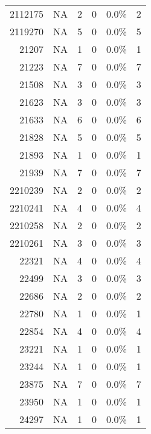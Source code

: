 \begin{longtable}{lrrrrr}
	    \multicolumn{1}{r}{2112175} & NA    & 2     & 0     & 0.0\% & 2 \\
	    \multicolumn{1}{r}{2119270} & NA    & 5     & 0     & 0.0\% & 5 \\
	    \multicolumn{1}{r}{21207} & NA    & 1     & 0     & 0.0\% & 1 \\
	    \multicolumn{1}{r}{21223} & NA    & 7     & 0     & 0.0\% & 7 \\
	    \multicolumn{1}{r}{21508} & NA    & 3     & 0     & 0.0\% & 3 \\
	    \multicolumn{1}{r}{21623} & NA    & 3     & 0     & 0.0\% & 3 \\
	    \multicolumn{1}{r}{21633} & NA    & 6     & 0     & 0.0\% & 6 \\
	    \multicolumn{1}{r}{21828} & NA    & 5     & 0     & 0.0\% & 5 \\
	    \multicolumn{1}{r}{21893} & NA    & 1     & 0     & 0.0\% & 1 \\
	    \multicolumn{1}{r}{21939} & NA    & 7     & 0     & 0.0\% & 7 \\
	    \multicolumn{1}{r}{2210239} & NA    & 2     & 0     & 0.0\% & 2 \\
	    \multicolumn{1}{r}{2210241} & NA    & 4     & 0     & 0.0\% & 4 \\
	    \multicolumn{1}{r}{2210258} & NA    & 2     & 0     & 0.0\% & 2 \\
	    \multicolumn{1}{r}{2210261} & NA    & 3     & 0     & 0.0\% & 3 \\
	    \multicolumn{1}{r}{22321} & NA    & 4     & 0     & 0.0\% & 4 \\
	    \multicolumn{1}{r}{22499} & NA    & 3     & 0     & 0.0\% & 3 \\
	    \multicolumn{1}{r}{22686} & NA    & 2     & 0     & 0.0\% & 2 \\
	    \multicolumn{1}{r}{22780} & NA    & 1     & 0     & 0.0\% & 1 \\
	    \multicolumn{1}{r}{22854} & NA    & 4     & 0     & 0.0\% & 4 \\
	    \multicolumn{1}{r}{23221} & NA    & 1     & 0     & 0.0\% & 1 \\
	    \multicolumn{1}{r}{23244} & NA    & 1     & 0     & 0.0\% & 1 \\
	    \multicolumn{1}{r}{23875} & NA    & 7     & 0     & 0.0\% & 7 \\
	    \multicolumn{1}{r}{23950} & NA    & 1     & 0     & 0.0\% & 1 \\
	    \multicolumn{1}{r}{24297} & NA    & 1     & 0     & 0.0\% & 1 \\

\end{longtable}

